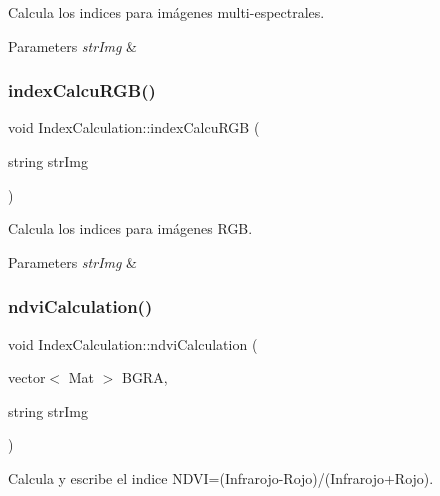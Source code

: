 Calcula los indices para imágenes multi-\/espectrales. 


\begin{DoxyParams}{Parameters}
{\em str\+Img} & \\
\hline
\end{DoxyParams}
\mbox{\label{classIndexCalculation_a7070ce3aebd8abd71074270eff8f88b6}} 
\subsubsection{\texorpdfstring{index\+Calcu\+R\+G\+B()}{indexCalcuRGB()}}
{\footnotesize\ttfamily void Index\+Calculation\+::index\+Calcu\+R\+GB (\begin{DoxyParamCaption}\item[{string}]{str\+Img }\end{DoxyParamCaption})\hspace{0.3cm}{\ttfamily [inline]}}



Calcula los indices para imágenes R\+GB. 


\begin{DoxyParams}{Parameters}
{\em str\+Img} & \\
\hline
\end{DoxyParams}
\mbox{\label{classIndexCalculation_a4d727b91eeb0676b3ffcfaf26ec02a32}} 
\subsubsection{\texorpdfstring{ndvi\+Calculation()}{ndviCalculation()}}
{\footnotesize\ttfamily void Index\+Calculation\+::ndvi\+Calculation (\begin{DoxyParamCaption}\item[{vector$<$ Mat $>$}]{B\+G\+RA,  }\item[{string}]{str\+Img }\end{DoxyParamCaption})\hspace{0.3cm}{\ttfamily [inline]}}



Calcula y escribe el indice N\+D\+VI=(Infrarojo-\/\+Rojo)/(Infrarojo+\+Rojo). 


